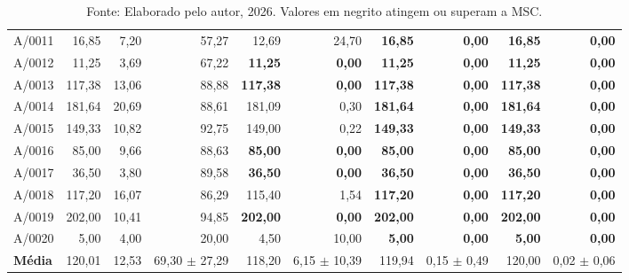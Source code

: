 \begin{table}[htbp]
{\begin{tabular}{l r r r r r r r r r}
      A/0011 & 16,85 & 7,20 & 57,27 & 12,69 & 24,70 & \textbf{16,85} & \textbf{0,00} & \textbf{16,85} & \textbf{0,00} \\
      A/0012 & 11,25 & 3,69 & 67,22 & \textbf{11,25} & \textbf{0,00} & \textbf{11,25} & \textbf{0,00} & \textbf{11,25} & \textbf{0,00} \\
      A/0013 & 117,38 & 13,06 & 88,88 & \textbf{117,38} & \textbf{0,00} & \textbf{117,38} & \textbf{0,00} & \textbf{117,38} & \textbf{0,00} \\
      A/0014 & 181,64 & 20,69 & 88,61 & 181,09 & 0,30 & \textbf{181,64} & \textbf{0,00} & \textbf{181,64} & \textbf{0,00} \\
      A/0015 & 149,33 & 10,82 & 92,75 & 149,00 & 0,22 & \textbf{149,33} & \textbf{0,00} & \textbf{149,33} & \textbf{0,00} \\
      A/0016 & 85,00 & 9,66 & 88,63 & \textbf{85,00} & \textbf{0,00} & \textbf{85,00} & \textbf{0,00} & \textbf{85,00} & \textbf{0,00} \\
      A/0017 & 36,50 & 3,80 & 89,58 & \textbf{36,50} & \textbf{0,00} & \textbf{36,50} & \textbf{0,00} & \textbf{36,50} & \textbf{0,00} \\
      A/0018 & 117,20 & 16,07 & 86,29 & 115,40 & 1,54 & \textbf{117,20} & \textbf{0,00} & \textbf{117,20} & \textbf{0,00} \\
      A/0019 & 202,00 & 10,41 & 94,85 & \textbf{202,00} & \textbf{0,00} & \textbf{202,00} & \textbf{0,00} & \textbf{202,00} & \textbf{0,00} \\
      A/0020 & 5,00 & 4,00 & 20,00 & 4,50 & 10,00 & \textbf{5,00} & \textbf{0,00} & \textbf{5,00} & \textbf{0,00} \\
      \midrule
      \textbf{Média} & 120,01 & 12,53 & 69,30 $\pm$ 27,29 & 118,20 & 6,15 $\pm$ 10,39 & 119,94 & 0,15 $\pm$ 0,49 & 120,00 & 0,02 $\pm$ 0,06 \\
      \bottomrule
    \end{tabular}
  }
  \caption*{\footnotesize Fonte: Elaborado pelo autor, 2026. Valores em negrito atingem ou superam a MSC.}
\end{table}

